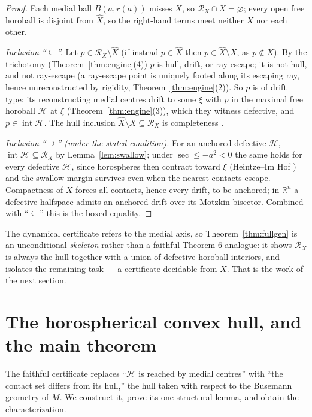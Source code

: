 \documentclass[11pt]{article}
\theoremstyle{remark}
\newcommand{\R}{\mathbb{R}}
\newcommand{\X}{X}
\newcommand{\Xhat}{\widehat{\X}}
\newcommand{\Rx}{\mathcal{R}_{\X}}
\newcommand{\Hb}[1]{\mathcal{H}_{#1}}
\begin{document}
\begin{proof}
Each medial ball $B(a,r(a))$ misses $X$, so $\Rx\cap X=\varnothing$;
every open free horoball is disjoint from $\Xhat$, so the right-hand
terms meet neither $X$ nor each other.

\emph{Inclusion ``$\subseteq$''.} Let $p\in\Rx\setminus\Xhat$ (if
instead $p\in\Xhat$ then $p\in\Xhat\setminus X$, as $p\notin X$). By
the trichotomy (Theorem~\ref{thm:engine}(4)) $p$ is hull, drift, or
ray-escape; it is not hull, and not ray-escape (a ray-escape point is
uniquely footed along its escaping ray, hence unreconstructed by
rigidity, Theorem~\ref{thm:engine}(2)). So $p$ is of drift type: its
reconstructing medial centres drift to some $\xi$ with $p$ in the
maximal free horoball $\Hb{}$ at $\xi$ (Theorem~\ref{thm:engine}(3)),
which they witness defective, and $p\in\operatorname{int}\Hb{}$. The
hull inclusion $\Xhat\setminus X\subseteq\Rx$ is completeness
\cite[Thm.~3.1]{R1}.

\emph{Inclusion ``$\supseteq$'' (under the stated condition).} For an
anchored defective $\Hb{}$, $\operatorname{int}\Hb{}\subseteq\Rx$ by
Lemma~\ref{lem:swallow}; under $\sec\le-a^{2}<0$ the same holds for
every defective $\Hb{}$, since horospheres then contract toward $\xi$
(Heintze--Im Hof \cite{HIH}) and the swallow margin survives even when
the nearest contacts escape. Compactness of $X$ forces all contacts,
hence every drift, to be anchored; in $\R^{n}$ a defective halfspace
admits an anchored drift over its Motzkin bisector. Combined with
``$\subseteq$'' this is the boxed equality.
\end{proof}

The dynamical certificate refers to the medial axis, so
Theorem~\ref{thm:fullgen} is an unconditional \emph{skeleton} rather
than a faithful Theorem-6 analogue: it shows $\Rx$ is always the hull
together with a union of defective-horoball interiors, and isolates the
remaining task --- a certificate decidable from $X$. That is the work
of the next section.

\section{The horospherical convex hull, and the main theorem}
\label{sec:hconv}

The faithful certificate replaces ``$\Hb{}$ is reached by medial
centres'' with ``the contact set differs from its hull,'' the hull
taken with respect to the Busemann geometry of $M$. We construct it,
prove its one structural lemma, and obtain the characterization.
\end{document}
